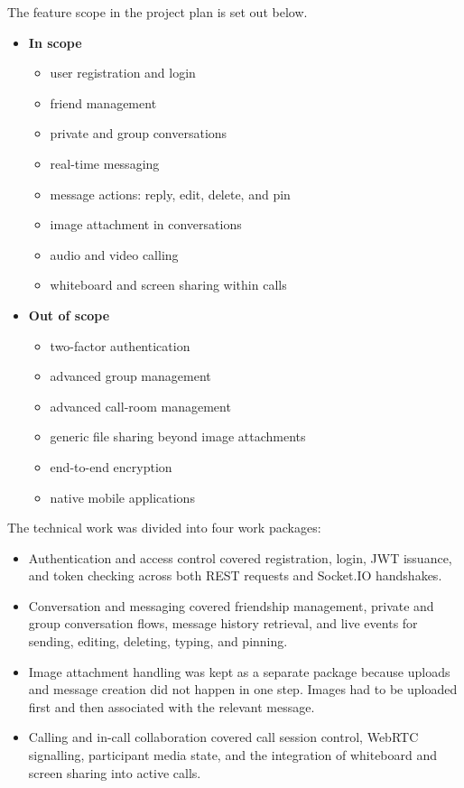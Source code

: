 \documentclass[12pt,a4paper]{article}
\begin{document}
The feature scope in the project plan is set out below.

\begin{itemize}
    \item \textbf{In scope}
    \begin{itemize}
        \item user registration and login
        \item friend management
        \item private and group conversations
        \item real-time messaging
        \item message actions: reply, edit, delete, and pin
        \item image attachment in conversations
        \item audio and video calling
        \item whiteboard and screen sharing within calls
    \end{itemize}
    \item \textbf{Out of scope}
    \begin{itemize}
        \item two-factor authentication
        \item advanced group management
        \item advanced call-room management
        \item generic file sharing beyond image attachments
        \item end-to-end encryption
        \item native mobile applications
    \end{itemize}
\end{itemize}

The technical work was divided into four work packages:

\begin{itemize}
    \item Authentication and access control covered registration, login, JWT issuance, and token checking across both REST requests and Socket.IO handshakes.
    \item Conversation and messaging covered friendship management, private and group conversation flows, message history retrieval, and live events for sending, editing, deleting, typing, and pinning.
    \item Image attachment handling was kept as a separate package because uploads and message creation did not happen in one step. Images had to be uploaded first and then associated with the relevant message.
    \item Calling and in-call collaboration covered call session control, WebRTC signalling, participant media state, and the integration of whiteboard and screen sharing into active calls.
\end{itemize}
\end{document}
